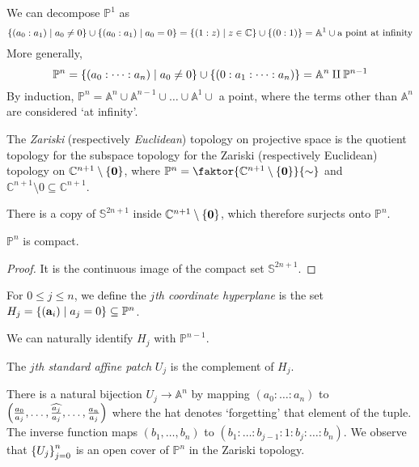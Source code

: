 We can decompose \( \mathbb P^1 \) as
\[ \qty{(a_0 : a_1) \mid a_0 \neq 0} \cup \qty{(a_0 : a_1) \mid a_0 = 0} = \qty{\qty(1 : z) \mid z \in \mathbb C} \cup \qty{(0 : 1)} = \mathbb A^1 \cup \text{a point at infinity} \]
More generally,
\[ \mathbb P^n = \qty{(a_0 : \dots : a_n) \mid a_0 \neq 0} \cup \qty{(0 : a_1 : \dots : a_n)} = \mathbb A^n \amalg \mathbb P^{n-1} \]
By induction, \( \mathbb P^n = \mathbb A^n \cup \mathbb A^{n-1} \cup \dots \cup \mathbb A^1 \cup \) a point, where the terms other than \( \mathbb A^n \) are considered `at infinity'.
\begin{definition}
    The \emph{Zariski} (respectively \emph{Euclidean}) topology on projective space is the quotient topology for the subspace topology for the Zariski (respectively Euclidean) topology on \( \mathbb C^{n+1} \setminus \qty{\vb 0} \), where \( \mathbb P^n = \faktor{\mathbb C^{n+1} \setminus \qty{\vb 0}}{\sim} \) and \( \mathbb C^{n+1} \setminus \qty{0} \subseteq \mathbb C^{n+1} \).
\end{definition}
There is a copy of \( \mathbb S^{2n+1} \) inside \( \mathbb C^{n+1} \setminus \qty{\vb 0} \), which therefore surjects onto \( \mathbb P^n \).
\begin{corollary}
    \( \mathbb P^n \) is compact.
\end{corollary}
\begin{proof}
    It is the continuous image of the compact set \( \mathbb S^{2n+1} \).
\end{proof}
\begin{definition}
    For \( 0 \leq j \leq n \), we define the \emph{\( j \)th coordinate hyperplane} is the set \( H_j = \qty{(\vb a_i) \mid a_j = 0} \subseteq \mathbb P^n \).
\end{definition}
We can naturally identify \( H_j \) with \( \mathbb P^{n-1} \).
\begin{definition}
    The \emph{\( j \)th standard affine patch} \( U_j \) is the complement of \( H_j \).
\end{definition}
There is a natural bijection \( U_j \to \mathbb A^n \) by mapping \( (a_0 : \dots : a_n) \) to \( \qty(\frac{a_0}{a_j}, \dots, \widehat{\frac{a_j}{a_j}}, \dots, \frac{a_n}{a_j}) \) where the hat denotes `forgetting' that element of the tuple.
The inverse function maps \( (b_1, \dots, b_n) \) to \( (b_1 : \dots : b_{j-1} : 1 : b_j : \dots : b_n) \).
We observe that \( \qty{U_j}_{j=0}^n \) is an open cover of \( \mathbb P^n \) in the Zariski topology.

